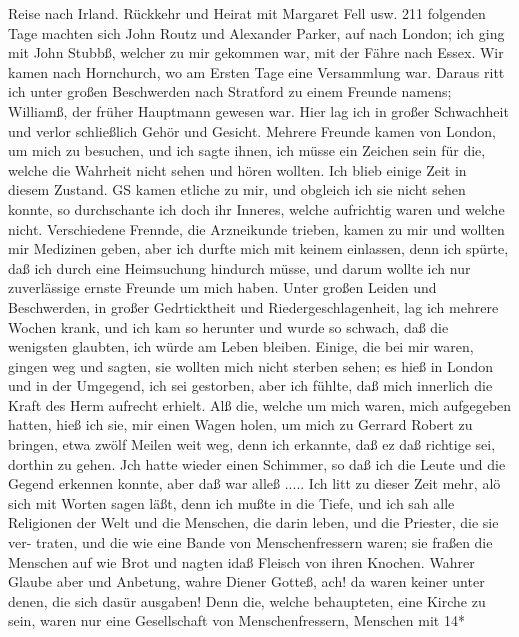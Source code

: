 Reise nach Irland. Rückkehr und Heirat mit Margaret Fell usw. 211
folgenden Tage machten sich John Routz und Alexander Parker,
auf nach London; ich ging mit John Stubbß, welcher zu mir
gekommen war, mit der Fähre nach Essex. Wir kamen nach
Hornchurch, wo am Ersten Tage eine Versammlung war. Daraus
ritt ich unter großen Beschwerden nach Stratford zu einem
Freunde namens; Williamß, der früher Hauptmann gewesen war.
Hier lag ich in großer Schwachheit und verlor schließlich Gehör
und Gesicht. Mehrere Freunde kamen von London, um mich zu
besuchen, und ich sagte ihnen, ich müsse ein Zeichen sein für die,
welche die Wahrheit nicht sehen und hören wollten. Ich blieb
einige Zeit in diesem Zustand. GS kamen etliche zu mir, und
obgleich ich sie nicht sehen konnte, so durchschante ich doch ihr
Inneres, welche aufrichtig waren und welche nicht. Verschiedene
Frennde, die Arzneikunde trieben, kamen zu mir und wollten mir
Medizinen geben, aber ich durfte mich mit keinem einlassen, denn
ich spürte, daß ich durch eine Heimsuchung hindurch müsse, und
darum wollte ich nur zuverlässige ernste Freunde um mich haben.
Unter großen Leiden und Beschwerden, in großer Gedrticktheit und
Riedergeschlagenheit, lag ich mehrere Wochen krank, und ich kam
so herunter und wurde so schwach, daß die wenigsten glaubten,
ich würde am Leben bleiben. Einige, die bei mir waren, gingen
weg und sagten, sie wollten mich nicht sterben sehen; es hieß in
London und in der Umgegend, ich sei gestorben, aber ich fühlte,
daß mich innerlich die Kraft des Herm aufrecht erhielt. Alß die,
welche um mich waren, mich aufgegeben hatten, hieß ich sie, mir
einen Wagen holen, um mich zu Gerrard Robert zu bringen,
etwa zwölf Meilen weit weg, denn ich erkannte, daß ez daß
richtige sei, dorthin zu gehen. Jch hatte wieder einen Schimmer,
so daß ich die Leute und die Gegend erkennen konnte, aber daß
war alleß .....
Ich litt zu dieser Zeit mehr, alö sich mit Worten sagen läßt,
denn ich mußte in die Tiefe, und ich sah alle Religionen der Welt
und die Menschen, die darin leben, und die Priester, die sie ver-
traten, und die wie eine Bande von Menschenfressern waren; sie
fraßen die Menschen auf wie Brot und nagten idaß Fleisch von
ihren Knochen. Wahrer Glaube aber und Anbetung, wahre
Diener Gotteß, ach! da waren keiner unter denen, die sich dasür
ausgaben! Denn die, welche behaupteten, eine Kirche zu sein,
waren nur eine Gesellschaft von Menschenfressern, Menschen mit
14*


